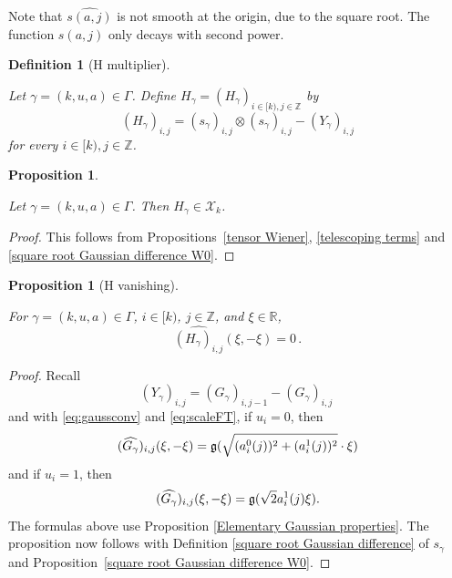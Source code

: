 \documentclass[12pt,reqno]{amsart}
\theoremstyle{plain}
\newtheorem{proposition}[theorem]{Proposition}
\newtheorem{definition}[theorem]{Definition}
\numberwithin{equation}{section}
\theoremstyle{remark}
\newcommand{\uses}[1]{}
\newcommand{\usesdefs}[1]{}
\newcommand{\leanok}{}
\newcommand{\lean}[1]{}
\newcommand{\Z}{{\mathbb Z}}
\newcommand{\R}{{\mathbb R}}
\begin{document}
Note that $\widehat{s(a,j)}$ is not smooth at the origin, due to the square root. The function $s(a,j)$ only decays with second power.


\begin{definition}[H multiplier]\label{H multiplier}\uses{}\usesdefs{geometric parameters,auto:Gaussian-difference-kernel-definition,s multiplier}
\lean{Auto.hMultiplier}
Let $\gamma=(k,u,a)\in \Gamma$. Define
    $H_{\gamma}=(H_\gamma)_{i\in [k),j\in \Z}$ by
\begin{equation}\label{auto:H-kernel-definition}
(H_{\gamma})_{i,j}=(s_{\gamma})_{i,j}\otimes (s_{\gamma})_{i,j}
  -(Y_{\gamma})_{i,j}
\end{equation}
for every $i\in [k), j\in\mathbb{Z}$.
\end{definition}

\begin{proposition}\label{H-in-X}\uses{tensor Wiener,telescoping terms,square root Gaussian difference W0}\usesdefs{geometric parameters,double sequence of 2D functions,H multiplier}
\lean{Auto.hMultiplier_memDoubleSequence}
\leanok
Let $\gamma=(k,u,a)\in \Gamma$. Then $H_{\gamma}\in \mathcal{X}_k$.
\end{proposition}
\begin{proof}
This follows from Propositions~\ref{tensor Wiener}, \ref{telescoping terms} and \ref{square root Gaussian difference W0}.
\end{proof}


\begin{proposition}[H vanishing]\label{H vanishing}\uses{Elementary Gaussian properties,square root Gaussian difference W0}\usesdefs{gaussian,geometric parameters,2D Gaussians,auto:Gaussian-difference-kernel-definition,square root Gaussian difference,s multiplier,H multiplier}
\lean{Auto.hMultiplier_fourier_diagonal_vanishing}
\leanok
    For $\gamma=(k,u,a)\in \Gamma$, $i\in [k)$, $j\in \Z$, and $\xi\in \R$,
\begin{equation}\label{auto:H-kernel-diagonal-cancellation-Fourier}
    \widehat{(H_{\gamma})_{i,j}}(\xi,-\xi)=0\, .
\end{equation}
\end{proposition}

\begin{proof}
Recall
\[ (Y_\gamma)_{i,j} = (G_\gamma)_{i,j-1} - (G_\gamma)_{i,j}\ \]
and with \eqref{eq:gaussconv} and \eqref{eq:scaleFT}, if $u_i=0$, then
\[ (\widehat{G_\gamma})_{i,j}(\xi, -\xi) = \mathfrak{g}(\sqrt{(a_{i}^0(j))^2 + (a_{i}^1(j))^2}\cdot \xi) \]
and if $u_i=1$, then
\[ (\widehat{G_\gamma})_{i,j}(\xi, -\xi) = \mathfrak{g}(\sqrt{2} a_{i}^1(j) \xi).\]
The formulas above use Proposition \ref{Elementary Gaussian properties}. The proposition now follows with Definition \ref{square root Gaussian difference} of $s_\gamma$ and Proposition~\ref{square root Gaussian difference W0}.
\end{proof}
\end{document}
